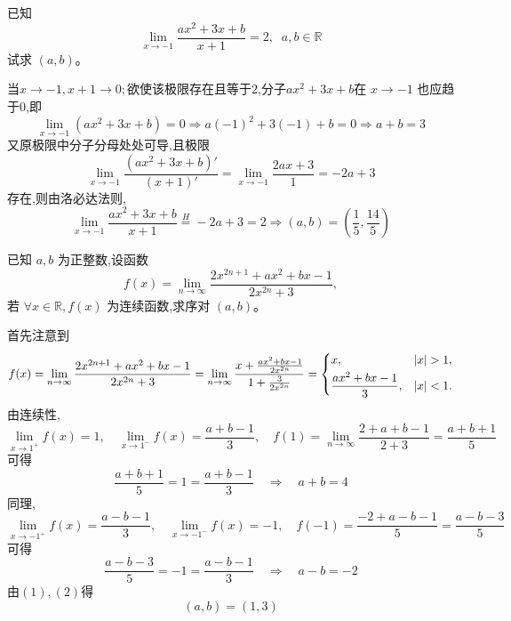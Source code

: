 \begin{questions}
    \question 已知
    \[
    \lim_{x \to -1} \frac{a x^2 + 3x + b}{x + 1} = 2,\;\; a,b \in \mathbb{R}
    \]
    试求 \( (a, b) \)。
    \begin{solution}
        当$x\rightarrow-1,x+1\rightarrow0;$欲使该极限存在且等于$2$,分子$a x^2 + 3x + b$在 \(x\rightarrow-1\) 也应趋于$0$,即
        \[
        \lim_{x \to -1} (a x^2 + 3x + b)=0 \Rightarrow a(-1)^2 + 3(-1) + b = 0 \Rightarrow  a + b = 3 \tag{1}
        \]
        又原极限中分子分母处处可导,且极限
        \[
        \lim_{x \to -1} \frac{(a x^2 + 3x + b)'}{(x + 1)'}
        = \lim_{x \to -1} \frac{2a x + 3}{1} = -2a + 3 
        \]
        存在,则由洛必达法则,
        \[
        \lim_{x \to -1} \frac{a x^2 + 3x + b}{x + 1} \overset{H}{=}-2a + 3 = 2 \Rightarrow (a,b) = \left( \dfrac{1}{5}, \dfrac{14}{5} \right)
        \]
    \end{solution}

    \question 已知 $a,b$ 为正整数,设函数 
    \[
    f(x)=\lim_{n\rightarrow \infty}\frac{2x^{2n+1}+ax^{2}+bx-1}{2x^{2n}+3},
    \]
    若 $\forall x\in \mathbb{R},f(x)$ 为连续函数,求序对 $(a,b)$。
    \begin{solution}
        首先注意到
        \[
        f(x) = \lim_{n \rightarrow \infty} \frac{2x^{2n+1}+ ax^2+bx-1}{2x^{2n}+3} \\
        = \lim_{n \rightarrow \infty} \frac{x+ \frac{ax^2+bx-1}{2x^{2n}}}{1+\frac{3}{2x^{2n}}} \\
        = 
        \begin{cases}
        x, & |x| > 1,\\[1mm]
        \dfrac{ax^2+bx-1}{3}, & |x| < 1.
        \end{cases}
        \]
        由连续性,
        \[
        \lim_{x \rightarrow 1^+} f(x) = 1, \quad \lim_{x \rightarrow 1^-} f(x) = \frac{a+b-1}{3}, \quad f(1) = \lim_{n \rightarrow \infty} \frac{2+a+b-1}{2+3} = \frac{a+b+1}{5}
        \]
        可得
        \[
        \frac{a+b+1}{5} = 1 = \frac{a+b-1}{3} \quad \Rightarrow \quad a+b = 4 \tag{1}
        \]
        同理,
        \[
        \lim_{x \rightarrow -1^+} f(x) = \frac{a-b-1}{3}, \quad \lim_{x \rightarrow -1^-} f(x) = -1,\quad f(-1) = \frac{-2+a-b-1}{5} = \frac{a-b-3}{5}
        \]
        可得
        \[
        \frac{a-b-3}{5} = -1 = \frac{a-b-1}{3} \quad \Rightarrow \quad a-b = -2 \tag{2}
        \]
        由$(1),(2)$得 
        \[
        (a,b) = (1,3)
        \]
    \end{solution}
    

\end{questions}
